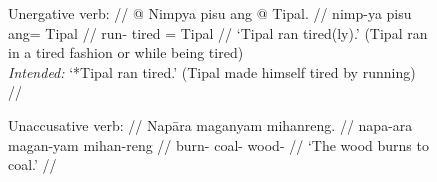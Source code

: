 \begin{figure}
\pex\label{ex:resitrns}
\a\label{ex:resitrns_unerg}\begingl
	\glpreamble Unergative verb: //
	\gla \upshape{\excl{}} @ Nimpya pisu ang @ Tipal. //
	\glb {} nimp-ya pisu ang= Tipal //
	\glc {} run-\TsgM{} tired \Aarg{}= Tipal //
	\glft \hphantom{\excl}`Tipal ran tired(ly).' (Tipal ran in a tired fashion 
		or while being tired) \\
		\hphantom{\excl}\textit{Intended:} `*Tipal ran tired.' (Tipal made
		himself tired by running) //
\endgl

\a\label{ex:resitrns_unacc}\begingl
	\glpreamble Unaccusative verb: //
	\gla Napāra maganyam mihanreng. //
	\glb napa-ara magan-yam mihan-reng //
	\glc burn-\TsgI{} coal-\Dat{} wood-\AargI{} //
	\glft `The wood burns to coal.' //
\endgl

\xe
\end{figure}

